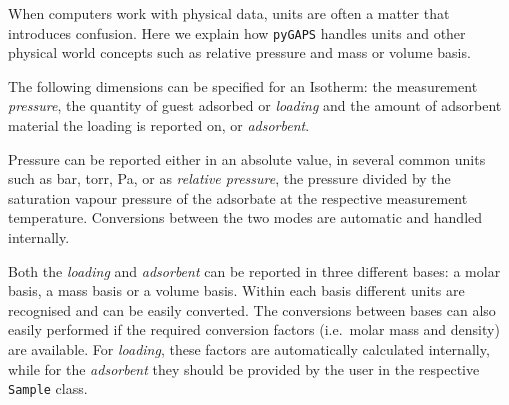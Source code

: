 When computers work with physical data, units are often a matter that introduces 
confusion. Here we explain how \texttt{pyGAPS} handles units and other physical 
world concepts such as relative pressure and mass or volume basis.

The following dimensions can be specified for an Isotherm: the measurement \textit{pressure},
the quantity of guest adsorbed or \textit{loading} and the amount of adsorbent material
the loading is reported on, or \textit{adsorbent}.

Pressure can be reported either in an absolute value, in several common units such as 
\si{\bar}, torr, \si{\pascal}, or as \textit{relative pressure}, the pressure 
divided by the saturation vapour pressure of the adsorbate at the respective measurement
temperature. Conversions between the two modes are automatic and handled internally.

Both the \textit{loading} and \textit{adsorbent} can be reported in three different bases:
a molar basis, a mass basis or a volume basis. Within each basis different
units are recognised and can be easily converted. The conversions between bases can also
easily performed if the required conversion factors (i.e.\ molar mass and density) are 
available. For \textit{loading}, these factors are automatically calculated internally, while
for the \textit{adsorbent} they should be provided by the user in the respective 
\texttt{Sample} class.